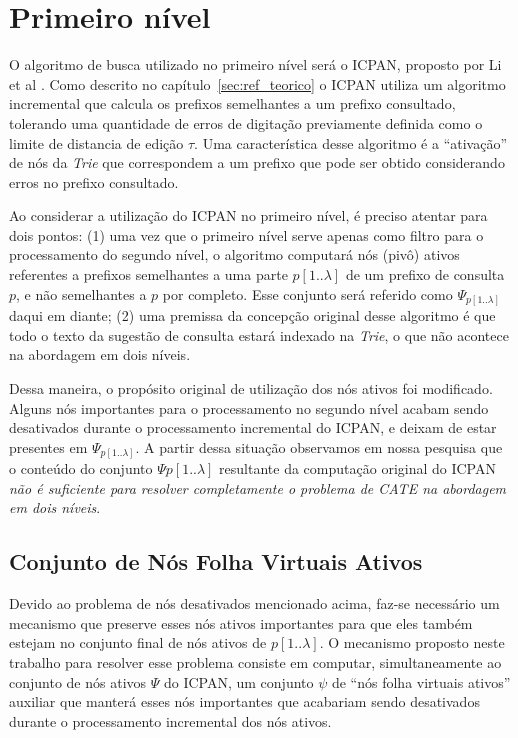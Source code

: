 \section{Primeiro nível}
\label{sec:first-level}

O algoritmo de busca utilizado no primeiro nível será o ICPAN, proposto por Li et al \citep{li2011efficient}. Como descrito no capítulo~\ref{sec:ref_teorico} o ICPAN utiliza um algoritmo incremental que calcula os prefixos semelhantes a um prefixo consultado, tolerando uma quantidade de erros de digitação previamente definida como o limite de distancia de edição $\tau$. Uma característica desse algoritmo é a ``ativação'' de nós da \textit{Trie} que correspondem a um prefixo que pode ser obtido considerando erros no prefixo consultado.

Ao considerar a utilização do ICPAN no primeiro nível, é preciso atentar para dois pontos: (1) uma vez que o primeiro nível serve apenas como filtro para o processamento do segundo nível, o algoritmo computará nós (pivô) ativos referentes a prefixos semelhantes a uma parte $p[1..\lambda]$ de um prefixo de consulta $p$, e não semelhantes a $p$ por completo. Esse conjunto será referido como $\Psi_{p[1..\lambda]}$ daqui em diante; (2) uma premissa da concepção original desse algoritmo é que todo o texto da sugestão de consulta estará indexado na \textit{Trie}, o que não acontece na abordagem em dois níveis.

Dessa maneira, o propósito original de utilização dos nós ativos foi modificado. Alguns nós importantes para o processamento no segundo nível acabam sendo desativados durante o processamento incremental do ICPAN, e deixam de estar presentes em $\Psi_{p[1..\lambda]}$. A partir dessa situação observamos em nossa pesquisa que o conteúdo do conjunto $\Psi{p[1..\lambda]}$ resultante da computação original do ICPAN \textit{não é suficiente para resolver completamente o problema de CATE na abordagem em dois níveis}. 

\subsection{Conjunto de Nós Folha Virtuais Ativos}
\label{sec:virtual_leaves_node-set}

Devido ao problema de nós desativados mencionado acima, faz-se necessário um mecanismo que preserve esses nós ativos importantes para que eles também estejam no conjunto final de nós ativos de $p[1..\lambda]$. O mecanismo proposto neste trabalho para resolver esse problema consiste em computar, simultaneamente ao conjunto de nós ativos $\Psi$ do ICPAN, um conjunto $\psi$ de ``nós folha virtuais ativos'' auxiliar que manterá esses nós importantes que acabariam sendo desativados durante o processamento incremental dos nós ativos. 

